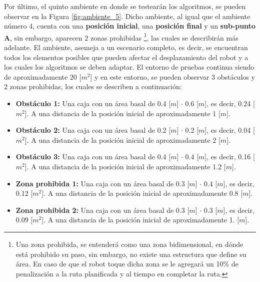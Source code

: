 Por último, el quinto ambiente en donde se testearán los algoritmos, se pueden observar en la Figura \ref{fig:ambiente_5}. Dicho ambiente, al igual que el ambiente número 4, cuenta con una \textbf{posición inicial}, una \textbf{posición final} y un \textbf{sub-punto A}, sin embargo, aparecen 2 zonas prohibidas \footnote{Una zona prohibida, se entenderá como una zona bidimensional, en dónde está prohibido su paso, sin embargo, no existe una estructura que define su área. En caso de que el robot toque dicha zona se le agregará un 10\% de penalización a la ruta planificada y al tiempo en completar la ruta.}, las cuales se describirán más adelante. El ambiente, asemeja a un escenario completo, es decir, se encuentran todos los elementos posibles que pueden afectar el desplazamiento del robot y a los cuales los algoritmos se deben adaptar. El entorno de pruebas continua siendo de aproximadamente 20 [$m^{2}$] y en este entorno, se pueden observar 3 obstáculos y 2 zonas prohibidas, los cuales se describen a continuación:
\begin{itemize}
    \item \textbf{Obstáculo 1:} Una caja con un área basal de 0.4 [$m$] $\cdot$ 0.6 [$m$], es decir, 0.24 [$m^{2}$]. A una distancia de la posición inicial de aproximadamente 1 [$m$].
    \item \textbf{Obstáculo 2:} Una caja con un área basal de 0.2 [$m$] $\cdot$ 0.2 [$m$], es decir, 0.04 [$m^{2}$]. A una distancia de la posición inicial de aproximadamente 2 [$m$].
    \item \textbf{Obstáculo 3:} Una caja con un área basal de 0.4 [$m$] $\cdot$ 0.4 [$m$], es decir, 0.16 [$m^{2}$]. A una distancia de la posición inicial de aproximadamente 1.2 [$m$].
    \item \textbf{Zona prohibida 1:} Una caja con un área basal de 0.3 [$m$] $\cdot$ 0.4 [$m$], es decir, 0.12 [$m^{2}$]. A una distancia de la posición inicial de aproximadamente 0.8 [$m$].
    \item \textbf{Zona prohibida 2:} Una caja con un área basal de 0.3 [$m$] $\cdot$ 0.3 [$m$], es decir, 0.09 [$m^{2}$]. A una distancia de la posición inicial de aproximadamente 1. [$m$].
\end{itemize} 


